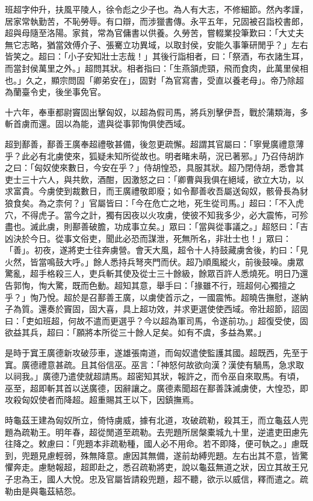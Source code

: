 
\begin{pinyinscope}
班超字仲升，扶風平陵人，徐令彪之少子也。為人有大志，不修細節。然內孝謹，居家常執勤苦，不恥勞辱。有口辯，而涉獵書傳。永平五年，兄固被召詣校書郎，超與母隨至洛陽。家貧，常為官傭書以供養。久勞苦，嘗輟業投筆歎曰：「大丈夫無它志略，猶當效傅介子、張騫立功異域，以取封侯，安能久事筆研閒乎？」左右皆笑之。超曰：「小子安知壯士志哉！」其後行詣相者，曰：「祭酒，布衣諸生耳，而當封侯萬里之外。」超問其狀。相者指曰：「生燕頷虎頸，飛而食肉，此萬里侯相也。」久之，顯宗問固「卿弟安在」，固對「為官寫書，受直以養老母」。帝乃除超為蘭臺令史，後坐事免官。

十六年，奉車都尉竇固出擊匈奴，以超為假司馬，將兵別擊伊吾，戰於蒲類海，多斬首虜而還。固以為能，遣與從事郭恂俱使西域。

超到鄯善，鄯善王廣奉超禮敬甚備，後忽更疏懈。超謂其官屬曰：「寧覺廣禮意薄乎？此必有北虜使來，狐疑未知所從故也。明者睹未萌，況已著邪。」乃召侍胡詐之曰：「匈奴使來數日，今安在乎？」侍胡惶恐，具服其狀。超乃閉侍胡，悉會其吏士三十六人，與共飲，酒酣，因激怒之曰：「卿曹與我俱在絕域，欲立大功，以求富貴。今虜使到裁數日，而王廣禮敬即廢；如令鄯善收吾屬送匈奴，骸骨長為豺狼食矣。為之柰何？」官屬皆曰：「今在危亡之地，死生從司馬。」超曰：「不入虎穴，不得虎子。當今之計，獨有因夜以火攻虜，使彼不知我多少，必大震怖，可殄盡也。滅此虜，則鄯善破膽，功成事立矣。」眾曰：「當與從事議之。」超怒曰：「吉凶決於今日。從事文俗吏，聞此必恐而謀泄，死無所名，非壯士也！」眾曰：「善」。初夜，遂將吏士往奔虜營。會天大風，超令十人持鼓藏虜舍後，約曰：「見火然，皆當鳴鼓大呼。」餘人悉持兵弩夾門而伏。超乃順風縱火，前後鼓噪。虜眾驚亂，超手格殺三人，吏兵斬其使及從士三十餘級，餘眾百許人悉燒死。明日乃還告郭恂，恂大驚，既而色動。超知其意，舉手曰：「掾雖不行，班超何心獨擅之乎？」恂乃悅。超於是召鄯善王廣，以虜使首示之，一國震怖。超曉告撫慰，遂納子為質。還奏於竇固，固大喜，具上超功效，并求更選使使西域。帝壯超節，詔固曰：「吏如班超，何故不遣而更選乎？今以超為軍司馬，令遂前功。」超復受使，固欲益其兵，超曰：「願將本所從三十餘人足矣。如有不虞，多益為累。」

是時于窴王廣德新攻破莎車，遂雄張南道，而匈奴遣使監護其國。超既西，先至于窴。廣德禮意甚疏。且其俗信巫。巫言：「神怒何故欲向漢？漢使有騧馬，急求取以祠我。」廣德乃遣使就超請馬。超密知其狀，報許之，而令巫自來取馬。有頃，巫至，超即斬其首以送廣德，因辭讓之。廣德素聞超在鄯善誅滅虜使，大惶恐，即攻殺匈奴使者而降超。超重賜其王以下，因鎮撫焉。

時龜茲王建為匈奴所立，倚恃虜威，據有北道，攻破疏勒，殺其王，而立龜茲人兜題為疏勒王。明年春，超從閒道至疏勒。去兜題所居槃橐城九十里，逆遣吏田慮先往降之。敕慮曰：「兜題本非疏勒種，國人必不用命。若不即降，便可執之。」慮既到，兜題見慮輕弱，殊無降意。慮因其無備，遂前劫縛兜題。左右出其不意，皆驚懼奔走。慮馳報超，超即赴之，悉召疏勒將吏，說以龜茲無道之狀，因立其故王兄子忠為王，國人大悅。忠及官屬皆請殺兜題，超不聽，欲示以威信，釋而遣之。疏勒由是與龜茲結怨。


\end{pinyinscope}
